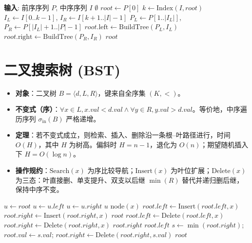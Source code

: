 \begin{algorithm}[H]
\caption{由前序与中序序列构造二叉树}
\begin{algorithmic}[1]
\State \textbf{输入}: 前序序列 $P$, 中序序列 $I$
        \State \Return $\emptyset$
    \EndIf
    \State $root \gets P[0]$ 
    \State $k \gets \text{Index}(I, root)$ 
    \State $I_L \gets I[0..k-1]$, $I_R \gets I[k+1..|I|-1]$
    \State $P_L \gets P[1..|I_L|]$, $P_R \gets P[|I_L|+1..|P|-1]$
    \State $root.\text{left} \gets \text{BuildTree}(P_L, I_L)$
    \State $root.\text{right} \gets \text{BuildTree}(P_R, I_R)$
    \State \Return $root$
\EndProcedure
\end{algorithmic}
\end{algorithm}

\section{二叉搜索树 (BST)}

\begin{itemize}
    \item \textbf{对象}：二叉树 $B = \langle d, L, R \rangle$，键来自全序集 $(K, <)$。
    \item \textbf{不变式（序）}：$\forall x \in L, x.val < d.val \land \forall y \in R, y.val > d.val$。等价地，中序遍历序列 $\sigma_{\text{in}}(B)$ 严格递增。
    \item \textbf{定理}：若不变式成立，则检索、插入、删除沿一条根--叶路径进行，时间 $O(H)$，其中 $H$ 为树高。偏斜时 $H = n-1$，退化为 $O(n)$；期望随机插入下 $H = O(\log n)$。
    \item \textbf{操作规约}：$\text{Search}(x)$ 为序比较导航；$\text{Insert}(x)$ 为叶位扩展；$\text{Delete}(x)$ 为三态：叶直接删、单支提升、双支以后继 $\min(R)$ 替代并递归删后继，保持中序不变。
\end{itemize}

\begin{algorithm}[H]
\caption{BST 规约（Search/Insert/Delete）}
\begin{algorithmic}[1]
    \State $u\gets root$   $u\gets u.left$ \Else $u\gets u.right$ \EndIf \EndWhile \State \Return $u$
\EndProcedure
{}
     \Return $\text{node}(x)$ \EndIf
     $root.left\gets\text{Insert}(root.left,x)$  $root.right\gets\text{Insert}(root.right,x)$ \EndIf \State \Return $root$
\EndProcedure
{}
     $root.left\gets\text{Delete}(root.left,x)$
     $root.right\gets\text{Delete}(root.right,x)$
     \Return $root.right$
     \Return $root.left$
    \Else $s\gets\min(root.right)$; $root.val\gets s.val$; $root.right\gets\text{Delete}(root.right,s.val)$ \EndIf
    \State \Return $root$
\EndProcedure
\end{algorithmic}
\end{algorithm}

